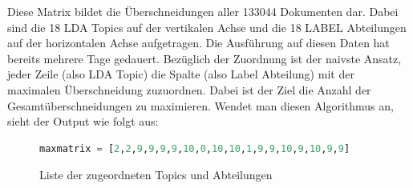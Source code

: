 \documentclass[german,version-2020-11]{uzl-thesis}
\begin{document}
\begin{enumerate}

Diese Matrix bildet die Überschneidungen aller 133044 Dokumenten dar. Dabei sind die 18 LDA Topics auf der vertikalen Achse und die 18 LABEL Abteilungen auf der horizontalen Achse aufgetragen. Die Ausführung auf diesen Daten hat bereits mehrere Tage gedauert. Bezüglich der Zuordnung ist der naivste Ansatz, jeder Zeile (also LDA Topic) die Spalte (also Label Abteilung) mit der maximalen Überschneidung zuzuordnen. Dabei ist der Ziel die Anzahl der Gesamtüberschneidungen zu maximieren. Wendet man diesen Algorithmus an, sieht der Output wie folgt aus: \\

\begin{figure}[H]
\begin{lstlisting}[language=Python]
maxmatrix = [2,2,9,9,9,9,10,0,10,10,1,9,9,10,9,10,9,9]
\end{lstlisting}
\caption{Liste der zugeordneten Topics und Abteilungen}
\end{figure}


\end{enumerate}
\end{document}
